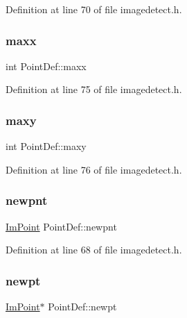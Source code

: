 Definition at line 70 of file imagedetect.\+h.

\mbox{\label{struct_point_def_aae00e1102867c41db8dd02c849154602}} 
\subsubsection{\texorpdfstring{maxx}{maxx}}
{\footnotesize\ttfamily int Point\+Def\+::maxx}



Definition at line 75 of file imagedetect.\+h.

\mbox{\label{struct_point_def_a5c7209ffaa60b839883b45681f98641f}} 
\subsubsection{\texorpdfstring{maxy}{maxy}}
{\footnotesize\ttfamily int Point\+Def\+::maxy}



Definition at line 76 of file imagedetect.\+h.

\mbox{\label{struct_point_def_a72fbff29bd56d693d97add03b2c644e7}} 
\subsubsection{\texorpdfstring{newpnt}{newpnt}}
{\footnotesize\ttfamily \mbox{\hyperlink{struct_im_point}{Im\+Point}} Point\+Def\+::newpnt}



Definition at line 68 of file imagedetect.\+h.

\mbox{\label{struct_point_def_a0b0c2f5e7044400abf72259c16551440}} 
\subsubsection{\texorpdfstring{newpt}{newpt}}
{\footnotesize\ttfamily \mbox{\hyperlink{struct_im_point}{Im\+Point}}$\ast$ Point\+Def\+::newpt}



